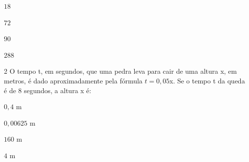 \begin{escolha}
\item $18$
\item $72$
\item $90$
\item $288$
\end{escolha}



\num{2}  O tempo t, em segundos, que uma pedra leva para cair de uma altura x,
em metros, é dado aproximadamente pela fórmula $t = 0,05$x. Se o tempo t
da queda é de $8$ segundos, a altura x é:

\begin{escolha}
\item $0,4$ m
\item $0,00625$ m
\item $160$ m
\item $4$ m
\end{escolha}


